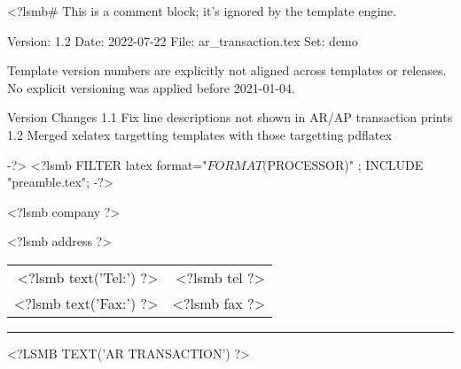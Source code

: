 <?lsmb#   This is a comment block; it's ignored by the template engine.

   Version:  1.2
   Date:     2022-07-22
   File:     ar_transaction.tex
   Set:      demo

Template version numbers are explicitly not aligned across templates or
releases. No explicit versioning was applied before 2021-01-04.

Version   Changes
1.1       Fix line descriptions not shown in AR/AP transaction prints
1.2       Merged xelatex targetting templates with those targetting pdflatex

-?>
<?lsmb FILTER latex { format="$FORMAT($PROCESSOR)" };
       INCLUDE "preamble.tex"; -?>



\pagestyle{empty}

\ifpdftex
  \fontsize{10pt}{12pt}\selectfont
\fi

\parbox{\textwidth}{%
  \parbox[b]{.42\textwidth}{%
    <?lsmb company ?>
   
    <?lsmb address ?>
  }
  \hfill
  \begin{tabular}[b]{rr@{}}
  <?lsmb text('Tel:') ?> & <?lsmb tel ?>\\
  <?lsmb text('Fax:') ?> & <?lsmb fax ?>
  \end{tabular}

  \rule[1.5em]{\textwidth}{0.5pt}
}

\centerline{\MakeUppercase{<?lsmb text('AR Transaction') ?>}}

\vspace*{0.5cm}

